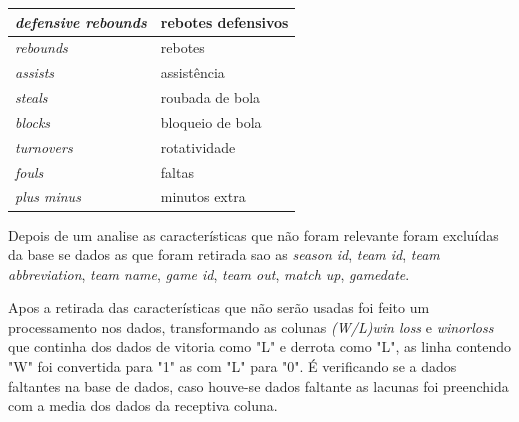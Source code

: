 \begin{table}[htbp]
\begin{longtable}{|l|l|}
		\textit{defensive rebounds}            & rebotes defensivos                                                                                                                                \\ \hline
		\textit{rebounds}                      & rebotes                                                                                                                                           \\ \hline
		\textit{assists}                       & assistência                                                                                                                                       \\ \hline
		\textit{steals}                        & roubada de bola                                                                                                                                   \\ \hline
		\textit{blocks}                        & bloqueio de bola                                                                                                                                  \\ \hline
		\textit{turnovers}                     & rotatividade                                                                                                                                      \\ \hline
		\textit{fouls}                         & faltas                                                                                                                                            \\ \hline
		\textit{plus minus}                    & minutos extra    \\ \hline                                                                       
	\end{longtable}
\end{table}

 Depois de um analise as características que não foram relevante foram excluídas da base se dados as que foram retirada sao as \textit{season id}, \textit{team id}, \textit{team abbreviation}, \textit{team name}, \textit{game id}, \textit{team out}, \textit{match up}, \textit{gamedate}.
 


 


Apos a retirada das características que não serão usadas foi feito um processamento nos dados, transformando as colunas \textit{(W/L)win loss} e \textit{winorloss} que continha dos dados de vitoria como "L" e derrota como "L", as linha contendo "W" foi convertida para "1" as com "L" para "0". É verificando se a dados faltantes na base de dados, caso houve-se dados faltante  as lacunas foi preenchida com a media dos dados da receptiva coluna.


